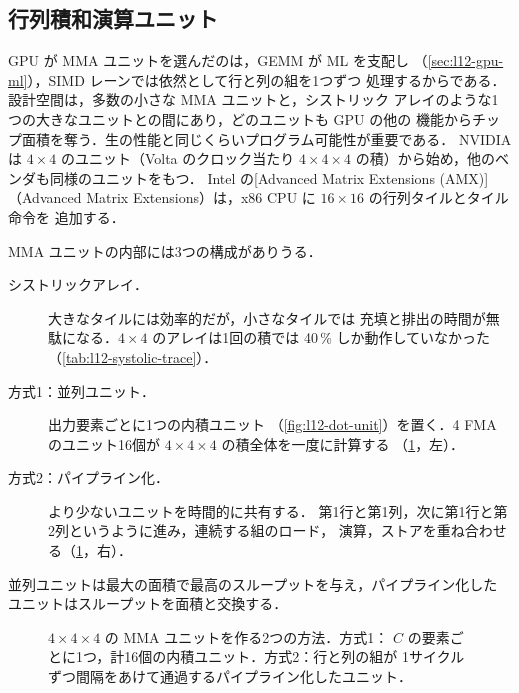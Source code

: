 \documentclass[../main.tex]{subfiles}
\begin{document}
\subsection{行列積和演算ユニット}

GPU が MMA ユニットを選んだのは，GEMM が ML を支配し
（\cref{sec:l12-gpu-ml}），SIMD レーンでは依然として行と列の組を1つずつ
処理するからである．設計空間は，多数の小さな MMA ユニットと，シストリック
アレイのような1つの大きなユニットとの間にあり，どのユニットも GPU の他の
機能からチップ面積を奪う．生の性能と同じくらいプログラム可能性が重要である．
NVIDIA は $4 \times 4$ のユニット（Volta のクロック当たり
$4 \times 4 \times 4$ の積）から始め，他のベンダも同様のユニットをもつ．
Intel の[Advanced Matrix Extensions (AMX)]（Advanced Matrix
Extensions）は，x86 CPU に $16 \times 16$ の行列タイルとタイル命令を
追加する．

MMA ユニットの内部には3つの構成がありうる．
\begin{description}
  \item[シストリックアレイ．]  大きなタイルには効率的だが，小さなタイルでは
    充填と排出の時間が無駄になる．$4 \times 4$ のアレイは1回の積では
    40\,\% しか動作していなかった（\cref{tab:l12-systolic-trace}）．
  \item[方式1：並列ユニット．]  出力要素ごとに1つの内積ユニット
    （\cref{fig:l12-dot-unit}）を置く．4 FMA のユニット16個が
    $4 \times 4 \times 4$ の積全体を一度に計算する
    （\cref{fig:l12-mma-options}，左）．
  \item[方式2：パイプライン化．]  より少ないユニットを時間的に共有する．
    第1行と第1列，次に第1行と第2列というように進み，連続する組のロード，
    演算，ストアを重ね合わせる（\cref{fig:l12-mma-options}，右）．
\end{description}
並列ユニットは最大の面積で最高のスループットを与え，パイプライン化した
ユニットはスループットを面積と交換する．

\begin{figure}[tb]
  \centering
  
  \caption{$4 \times 4 \times 4$ の MMA ユニットを作る2つの方法．方式1：
    $C$ の要素ごとに1つ，計16個の内積ユニット．方式2：行と列の組が
    1サイクルずつ間隔をあけて通過するパイプライン化したユニット．}
  \label{fig:l12-mma-options}
\end{figure}
\end{document}
